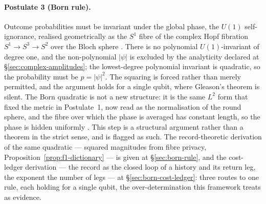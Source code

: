 \paragraph{Postulate 3 (Born rule).}
\label{sec:born-invariance}
Outcome probabilities must be invariant under the global phase, the $U(1)$
self-ignorance, realised geometrically as the $S^{1}$ fibre of the complex Hopf
fibration $S^{1}\to S^{3}\to S^{2}$ over the Bloch sphere
\autocite{Hopf1931, Urbantke2003}. There is no polynomial $U(1)$-invariant of degree one,
and the non-polynomial $\lvert\psi\rvert$ is excluded by the analyticity declared at
\S\ref{sec:complex-amplitudes}; the lowest-degree polynomial invariant is quadratic, so the
probability must be $p=\lvert\psi\rvert^{2}$. The squaring is forced
rather than merely permitted, and the argument holds for a single qubit, where
Gleason's theorem is silent. The Born quadratic is not a new structure: it is the
same $L^{2}$ form that fixed the metric in Postulate~1, now read as the
normalisation of the round sphere, and the fibre over which the phase is averaged
has constant length, so the phase is hidden uniformly
\autocite{GluckWarnerZiller1986}. This step is a structural argument rather than a
theorem in the strict sense, and is flagged as such. The record-theoretic derivation of the same
quadratic --- squared magnitudes from fibre privacy, Proposition~\ref{prop:f1-dictionary} --- is
given at \S\ref{sec:born-rule}, and the cost-ledger derivation --- the record as the closed loop of
a history and its return leg, the exponent the number of legs --- at \S\ref{sec:born-cost-ledger}:
three routes to one rule, each holding for a single qubit, the over-determination this framework
treats as evidence.

